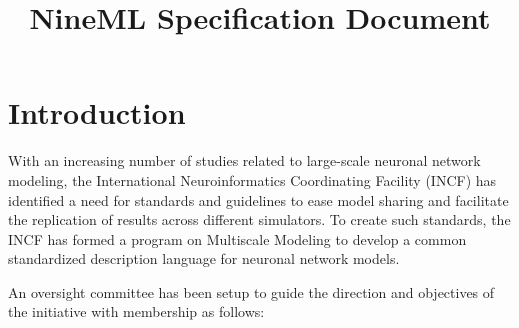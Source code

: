 \documentclass[a4paper]{article}
\begin{document}
\title{NineML Specification Document}

\newpage
\pagestyle{plain}

\tableofcontents

\section{Introduction}

 With an increasing number of studies related to large-scale neuronal
 network modeling, the International Neuroinformatics Coordinating
 Facility (INCF) has identified a need for standards and guidelines to
 ease model sharing and facilitate the replication of results across
 different simulators. To create such standards, the INCF has formed a
 program on Multiscale Modeling to develop a common standardized
 description language for neuronal network models.  

An oversight committee has been setup to guide the direction and
objectives of the initiative with membership as follows:
\end{document}
